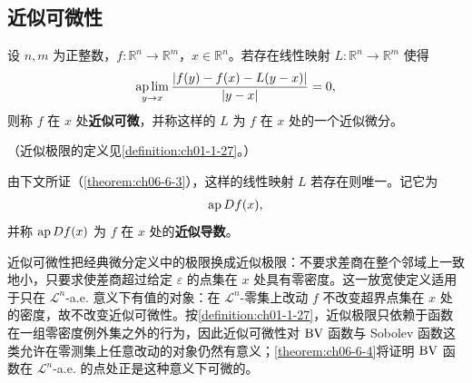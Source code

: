 \documentclass[../../main.tex]{subfiles}%
\begin{document}
\subsection{近似可微性}\label{subsection:ch06-01-3}

\begin{definition}[近似可微性]\label{definition:ch06-6-1}
设 $n,m$ 为正整数，$f:\mathbb{R}^n\to\mathbb{R}^m$，$x\in\mathbb{R}^n$。若存在线性映射 $L:\mathbb{R}^n\to\mathbb{R}^m$ 使得
\begin{align*}
\operatorname*{ap\,lim}_{y\to x}\frac{\lvert f(y)-f(x)-L(y-x)\rvert}{\lvert y-x\rvert}=0,
\end{align*}
则称 $f$ 在 $x$ 处\textbf{近似可微}，并称这样的 $L$ 为 $f$ 在 $x$ 处的一个近似微分。

（近似极限的定义见\cref{definition:ch01-1-27}。）%
\end{definition}

\begin{remark}\label{remark:ch06-def-6-1-近似导数}
由下文所证（\cref{theorem:ch06-6-3}），这样的线性映射 $L$ 若存在则唯一。记它为%
\begin{align*}
\operatorname{ap} Df(x),
\end{align*}
并称 $\operatorname{ap} Df(x)$ 为 $f$ 在 $x$ 处的\textbf{近似导数}。
\end{remark}

\begin{remark}\label{remark:ch06-def-6-1-动机}
近似可微性把经典微分定义中的极限换成近似极限：不要求差商在整个邻域上一致地小，只要求使差商超过给定 $\varepsilon$ 的点集在 $x$ 处具有零密度。这一放宽使定义适用于只在 $\mathcal{L}^n$-a.e. 意义下有值的对象：在 $\mathcal{L}^n$-零集上改动 $f$ 不改变超界点集在 $x$ 处的密度，故不改变近似可微性。按\cref{definition:ch01-1-27}，近似极限只依赖于函数在一组零密度例外集之外的行为，因此近似可微性对 $\mathrm{BV}$ 函数与 Sobolev 函数这类允许在零测集上任意改动的对象仍然有意义；\cref{theorem:ch06-6-4}将证明 $\mathrm{BV}$ 函数在 $\mathcal{L}^n$-a.e. 的点处正是这种意义下可微的。%
\end{remark}
\end{document}
